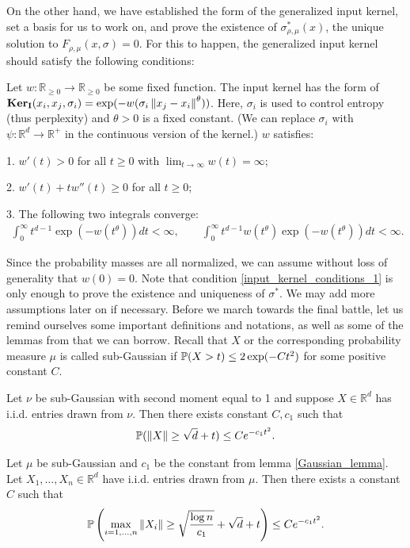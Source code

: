 \documentclass[10pt]{article}
\newcommand{\ki}{\mathbf{Ker}_{\mathbf{I}}}
\begin{document}
On the other hand, we have established the form of the generalized input
kernel, set a basis for us to work on, and prove the existence of
$\sigma_{\rho,\mu}^*(x)$, the unique solution to $F_{\rho,\mu}(x,\sigma) = 0$.
For this to happen, the generalized input kernel should satisfy the following
conditions:
\begin{condition} \label{input_kernel_conditions_1}
  Let $w: \mathbb{R}_{\geq 0} \to \mathbb{R}_{\geq 0}$ be some fixed function. The input kernel has the form of $\ki(x_i,x_j,\sigma_i) = \exp(-w(\sigma_i\norm{x_j-x_i}^{\theta}))$. Here, $\sigma_i$ is used to control entropy (thus perplexity) and $\theta>0$ is a fixed constant. (We can replace $\sigma_i$ with $\psi: \mathbb{R}^d \to \mathbb{R}^+$ in the continuous version of the kernel.) $w$ satisfies:

  1. $w'(t)>0$ for all $t \geq 0$ with $\lim_{t \to \infty} w(t) = \infty$;

  2. $w'(t)+tw''(t) \geq 0$ for all $t \geq 0$;

  3. The following two integrals converge:
  \begin{align}
    \int_0^{\infty} t^{d-1}\exp(-w(t^{\theta}))dt < \infty, \qquad \int_0^{\infty} t^{d-1} w(t^{\theta}) \exp(-w(t^{\theta}))dt < \infty.
  \end{align}

\end{condition}
Since the probability masses are all normalized, we can assume without loss of generality that $w(0)=0$. Note that condition \ref{input_kernel_conditions_1} is only enough to prove the existence and uniqueness of $\sigma^*$. We may add more assumptions later on if necessary. Before we march towards the final battle, let us remind ourselves some important definitions and notations, as well as some of the lemmas from \cite{auffinger-tsne} that we can borrow. Recall that $X$ or the corresponding probability measure $\mu$ is called sub-Gaussian if $\mathbb{P}(X>t) \leq 2 \exp(-Ct^2)$ for some positive constant $C$.
\begin{lemma} \label{Gaussian_lemma}
  Let $\nu$ be sub-Gaussian with second moment equal to 1 and suppose $X \in \mathbb{R}^d$ has i.i.d. entries drawn from $\nu$. Then there exists constant $C, c_1$ such that
  \begin{align}
    \mathbb{P}(\left\lVert X\right\rVert \geq \sqrt{d} + t) \leq Ce^{-c_1t^2}.
  \end{align}
\end{lemma}
\begin{lemma} \label{max_iid_lemma}
  Let $\mu$ be sub-Gaussian and $c_1$ be the constant from lemma \ref{Gaussian_lemma}. Let $X_1, \dots, X_n \in \mathbb{R}^d$ have i.i.d. entries drawn from $\mu$. Then there exists a constant $C$ such that
  \begin{align}
    \mathbb{P} \left (\max_{i=1,\dots,n}\left\lVert X_i\right\rVert \geq \sqrt{\frac{\log n}{c_1}}+\sqrt{d}+t \right ) \leq Ce^{-c_1t^2}.
  \end{align}
\end{lemma}
\end{document}
